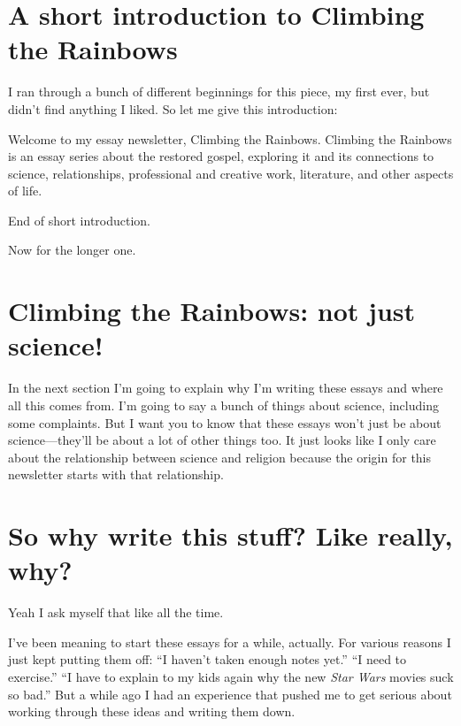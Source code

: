 \section{A short introduction to Climbing the Rainbows}

I ran through a bunch of different beginnings for this piece, my first ever, but didn’t find anything I liked. So let me give this introduction:

Welcome to my essay newsletter, Climbing the Rainbows. Climbing the Rainbows is an essay series about the restored gospel, exploring it and its connections to science, relationships, professional and creative work, literature, and other aspects of life.

End of short introduction.

Now for the longer one.

\section{Climbing the Rainbows: not just science!}

In the next section I’m going to explain why I’m writing these essays and where all this comes from. I’m going to say a bunch of things about science, including some complaints. But I want you to know that these essays won’t just be about science—they’ll be about a lot of other things too. It just looks like I only care about the relationship between science and religion because the origin for this newsletter starts with that relationship.

\section{So why write this stuff? Like really, why?}

Yeah I ask myself that like all the time. 

I’ve been meaning to start these essays for a while, actually. For various reasons I just kept putting them off: “I haven’t taken enough notes yet.” “I need to exercise.” “I have to explain to my kids again why the new \textit{Star Wars} movies suck so bad.” But a while ago I had an experience that pushed me to get serious about working through these ideas and writing them down.


